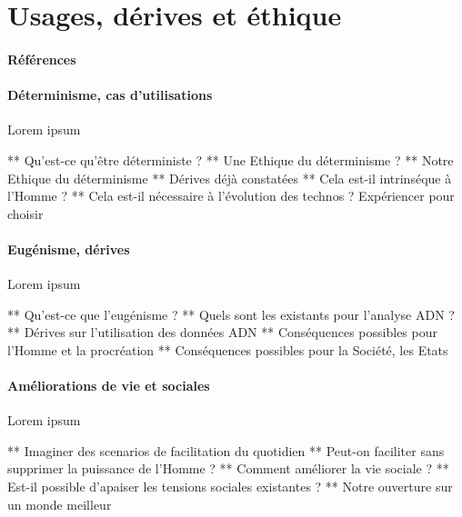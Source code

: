\section{Usages, dérives et éthique}
\paragraph{Références} \cite{Asimov0} \cite{Damasio0}

\paragraph{Déterminisme, cas d'utilisations} Lorem ipsum

** Qu'est-ce qu'être déterministe ?
** Une Ethique du déterminisme ?
** Notre Ethique du déterminisme
** Dérives déjà constatées
** Cela est-il intrinséque à l'Homme ?
** Cela est-il nécessaire à l'évolution des technos ? Expériencer pour choisir

\paragraph{Eugénisme, dérives} Lorem ipsum

** Qu'est-ce que l'eugénisme ?
** Quels sont les existants pour l'analyse ADN ?
** Dérives sur l'utilisation des données ADN
** Conséquences possibles pour l'Homme et la procréation
** Conséquences possibles pour la Société, les Etats

\paragraph{Améliorations de vie et sociales} Lorem ipsum

** Imaginer des scenarios de facilitation du quotidien
** Peut-on faciliter sans supprimer la puissance de l'Homme ?
** Comment améliorer la vie sociale ?
** Est-il possible d'apaiser les tensions sociales existantes ?
** Notre ouverture sur un monde meilleur